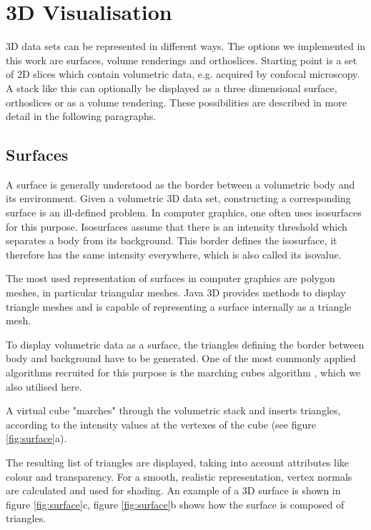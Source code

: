 \documentclass[a4paper,10pt]{article}
\begin{document}
\section{3D Visualisation}
3D data sets can be represented in different ways. The options we implemented in this work are surfaces, volume renderings and orthoslices.
Starting point is a set of 2D slices which contain volumetric data, e.g. acquired by confocal microscopy. A stack like this can optionally be displayed as a three dimensional surface, orthoslices or as a volume rendering. These possibilities are described in more detail in the following paragraphs.
\subsection{Surfaces}
A surface is generally understood as the border between a volumetric body and its environment. Given a volumetric 3D data set, constructing a corresponding surface is an ill-defined problem. In computer graphics, one often uses isosurfaces for this purpose. Isosurfaces assume that there is an intensity threshold which separates a body from its background. This border defines the isosurface, it therefore has the same intensity everywhere, which is also called its isovalue.

The most used representation of surfaces in computer graphics are polygon meshes, in particular triangular meshes. Java 3D provides methods to display triangle meshes and is capable of representing a surface internally as a triangle mesh.

To display volumetric data as a surface, the triangles defining the border between body and background have to be generated. One of the most commonly applied algorithms recruited for this purpose is the marching cubes algorithm \cite{lorensen87}, which we also utilised here.

A virtual cube "marches" through the volumetric stack and inserts triangles, according to the intensity values at the vertexes of the cube (see figure \ref{fig:surface}a).

The resulting list of triangles are displayed, taking into account attributes like colour and transparency. For a smooth, realistic representation, vertex normals are calculated and used for shading. An example of a 3D surface is shown in figure \ref{fig:surface}c, figure \ref{fig:surface}b shows how the surface is composed of triangles.
\end{document}
